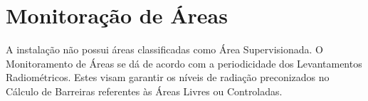 \chapter{Monitoração de Áreas}
A instalação não possui áreas classificadas como Área Supervisionada. O Monitoramento de Áreas se dá de acordo com a periodicidade dos Levantamentos Radiométricos. Estes visam garantir os níveis de radiação preconizados no Cálculo de Barreiras referentes às Áreas Livres ou Controladas.